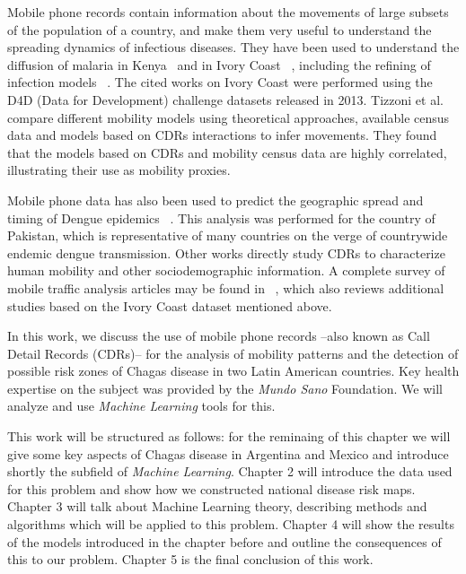 Mobile phone records contain information about the movements of large subsets of the population of a country, and make them very useful to understand the spreading dynamics of infectious diseases. They have been used to understand the diffusion of malaria in Kenya~ \textcite{wesolowski2012quantifying} and in Ivory Coast~ \textcite{enns2013human}, including the refining of infection models~ \textcite{chunara2013large}. The cited works on Ivory Coast were performed using the D4D (Data for Development) challenge datasets released in 2013. Tizzoni et al.~ \textcite{tizzoni2014use} compare different mobility models using theoretical approaches, available census data and models based on CDRs interactions to infer movements. They found that the models based on CDRs and mobility census data are highly correlated, illustrating their use as mobility proxies.

Mobile phone data has also been used to predict the geographic spread and timing of Dengue epidemics~ \textcite{wesolowski2015impact}. This analysis was performed for the country of Pakistan, which is representative of many countries on the verge of countrywide endemic dengue transmission. Other works directly study CDRs to characterize human mobility and other sociodemographic information. A complete survey of mobile traffic analysis articles may be found in~ \textcite{naboulsi2015mobile}, which also reviews additional studies based on the Ivory Coast dataset mentioned above.

In this work, we discuss the use of mobile phone records --also known as Call Detail Records (CDRs)-- for the analysis of mobility patterns and the detection of possible risk zones of Chagas disease in two Latin American countries. Key health expertise on the subject was provided by the \textit{Mundo Sano} Foundation. We will analyze and use  \textit{Machine Learning} tools for this. 

This work will be structured as follows: for the reminaing of this chapter we will give some key aspects of Chagas disease in Argentina and Mexico and introduce shortly the subfield of \textit{Machine Learning}. Chapter 2 will introduce the data used for this problem and show how we constructed national disease risk maps. Chapter 3 will talk about Machine Learning theory, describing methods and algorithms which will be applied to this problem. Chapter 4 will show the results of the models introduced in the chapter before and outline the consequences of this to our problem. Chapter 5 is the final conclusion of this work.



